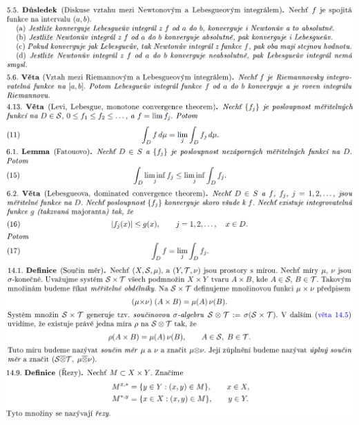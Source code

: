 \documentclass[12pt,a4paper]{article}
\begin{document}
\begin{center}
		\includegraphics[width=\textwidth]{img/1lebInt/2020-06-20 17 57 50.png}\vspace{0.3cm}
		\includegraphics[width=\textwidth]{img/1lebInt/2020-06-20 17 57 59.png}\vspace{0.3cm}
		\includegraphics[width=\textwidth]{img/1lebInt/2020-06-20 17 56 43.png}\vspace{0.3cm}
		\includegraphics[width=\textwidth]{img/1lebInt/2020-06-20 17 58 11.png}\vspace{0.3cm}
		\includegraphics[width=\textwidth]{img/1lebInt/2020-06-20 17 58 22.png}\vspace{0.3cm}
		\includegraphics[width=\textwidth]{img/1lebInt/2020-06-20 17 59 10.png}\vspace{0.3cm}
		\includegraphics[width=\textwidth]{img/1lebInt/2020-06-20 18 00 03.png}\vspace{0.3cm}

\end{center}
\end{document}
